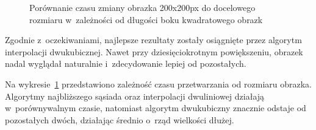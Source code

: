 \begin{figure}[h]
    \centering
    \caption{Porównanie czasu zmiany obrazka 200x200px do docelowego rozmiaru w~zależności od długości boku kwadratowego obrazk}
    \label{fig:resizing-time}
\end{figure}

Zgodnie z~oczekiwaniami, najlepsze rezultaty zostały osiągnięte przez algorytm interpolacji dwukubicznej. Nawet przy dziesięciokrotnym powiększeniu, obrazek nadal wyglądał naturalnie i~zdecydowanie lepiej od pozostałych.  

Na wykresie~\ref{fig:resizing-time} przedstawiono zależność czasu przetwarzania od rozmiaru obrazka. Algorytmy najbliższego sąsiada oraz interpolacji dwuliniowej działają w~porównywalnym czasie, natomiast algorytm dwukubiczny znacznie odstaje od pozostałych dwóch, działając średnio o~rząd wielkości dłużej.

